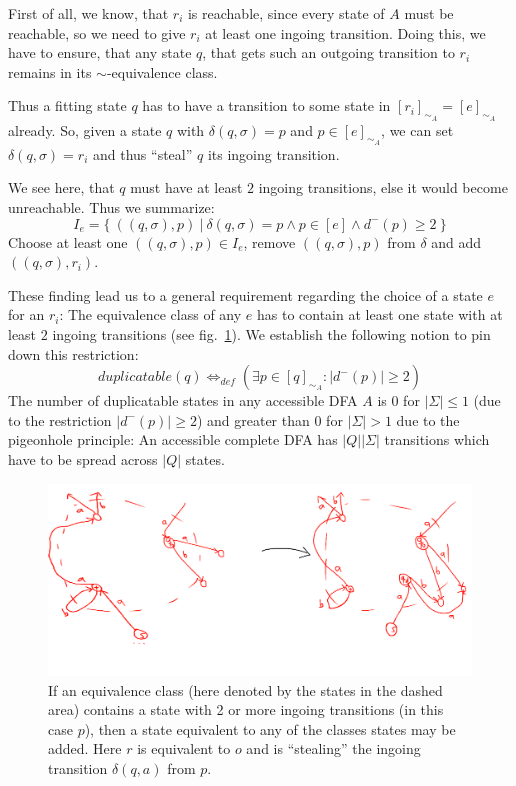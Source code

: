 First of all, we know, that $r_i$ is reachable, since every state of $A$ must be reachable, so we need to give $r_i$ at least one ingoing transition. Doing this, we have to ensure, that any state $q$, that gets such an outgoing transition to $r_i$ remains in its $\sim$-equivalence class.
	
Thus a fitting state $q$ has to have a transition to some state in $[r_i]_{\sim_A} = [e]_{\sim_A}$ already. So, given a state $q$ with $\delta(q, \sigma) = p$ and $p \in [e]_{\sim_A}$, we can set $\delta(q, \sigma) = r_i$ and thus ``steal'' $q$ its ingoing transition.

We see here, that $q$ must have at least $2$ ingoing transitions, else it would become unreachable. Thus we summarize:
\[
    I_e = \{\ ((q, \sigma), p)\ |\ \delta(q, \sigma) = p \land p \in [e] \land d^-(p) \geq 2\ \}
\]
Choose at least one $((q, \sigma), p) \in I_e$, remove $((q, \sigma), p)$ from $\delta$ and add $((q, \sigma), r_i)$. 

These finding lead us to a general requirement regarding the choice of a state $e$ for an $r_i$: The equivalence class of any $e$ has to contain at least one state with at least $2$ ingoing transitions (see fig.~\ref{fig:dfa_add_redundant_states}). We establish the following notion to pin down this restriction:
\[
	duplicatable(q) \Leftrightarrow_{def} (\exists p \in [q]_{\sim_A}\colon |d^-(p)| \geq 2)
\]
The number of duplicatable states in any accessible DFA $A$ is $0$ for $|\Sigma| \leq 1$ (due to the restriction $|d^-(p)| \geq 2$) and greater than $0$ for $|\Sigma| > 1$ due to the pigeonhole principle: An accessible complete DFA has $|Q||\Sigma|$ transitions which have to be spread across $|Q|$ states.
\begin{figure}
	\includegraphics[width=\linewidth]{images/dfa_add_redundant_states.png}
	\caption{If an equivalence class (here denoted by the states in the dashed area) contains a state with 2 or more ingoing transitions (in this case $p$), then a state equivalent to any of the classes states may be added. Here $r$ is equivalent to $o$ and is ``stealing'' the ingoing transition $\delta(q, a)$ from $p$.}
	\label{fig:dfa_add_redundant_states}
\end{figure}

